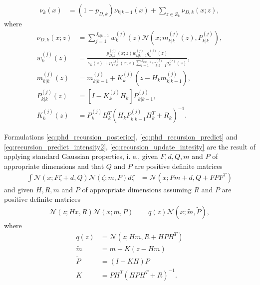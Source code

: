 \begin{align}
    \nu_{k}(x) &= (1-p_{D,k}) \nu_{k|k-1}(x) + \sum_{z\in Z_k}\nu_{D,k}(x;z), \label{eq:recursion_update_intesity}
\end{align}
where
\begin{align}
    \nu_{D,k}(x;z) &= \sum_{j=1}^{J_{k|k-1}} w_k^{(j)}(z) \mathcal{N}(x;m_{k|k}^{(j)}(z),P_{k|k}^{(j)}), \label{eq:recursion_update_intesity_detect} \\
    w_k^{(j)}(z) &= \frac{p_{D,k}^{(j)}(x;z) w_{k|k-1}^{(j)} q_k^{(j)}(z) }{\kappa_k(z) + p_{D,k}^{(j)}(x;z) \sum_{l=1}^{J_{k|k-1}} w_{k|k-1}^{(l)} q_k^{(l)}(z)}, \label{eq:recursion_update_intesity_detect_w} \\
    m_{k|k}^{(j)}(z) &= m_{k|k-1}^{(j)} + K_k^{(j)}(z-H_k m_{k|k-1}^{(j)}), \label{eq:recursion_update_intesity_detect_m} \\
    P_{k|k}^{(j)}(z) &= [I - K_k^{(j)} H_k] P_{k|k-1}^{(j)},  \label{eq:recursion_update_intesity_detect_P} \\
    K_{k}^{(j)}(z) &= P_{k}^{(j)} H_k^T(H_k P_{k|k-1}^{(j)} H_k^T + R_k)^{-1}. \label{eq:recursion_update_intesity_detect_K}
\end{align}

Formulations \eqref{eq:phd_recursion_posterior}, \eqref{eq:phd_recursion_predict} and \eqref{eq:recursion_predict_intensity2}, \eqref{eq:recursion_update_intesity} are the result of applying standard Gaussian properties, i. e., given $F, d, Q, m$ and $P$ of appropriate dimensions and that $Q$ and $P$ are positive definite matrices
\begin{align}
    \int \mathcal{N}(x; F\zeta + d, Q) \mathcal{N}(\zeta; m, P) d\zeta &= \mathcal{N}(x; Fm + d, Q + FPF^T) \label{eq:phd_integral_Gaussian}
\end{align}
and given $H, R, m$ and $P$ of appropriate dimensions assuming $R$ and $P$ are positive definite matrices
\begin{align}
    \mathcal{N}(z; Hx, R) \mathcal{N}(x;m,P) &= q(z)\mathcal{N}(x; \tilde{m}, \tilde{P}), \label{eq:phd_integral_Gaussian_measurement}
\end{align}
where
\begin{align}
    q(z) &= \mathcal{N}(z; Hm, R + HPH^T) \\
    \tilde{m} &= m + K(z - Hm) \\
    \tilde{P} &= (I - KH)P \\
    K &= PH^T(HPH^T + R)^{-1}.
\end{align}



